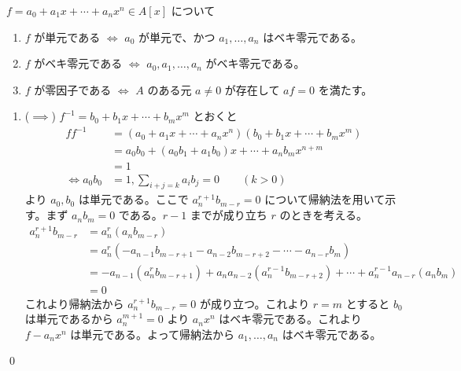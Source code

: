 \documentclass[uplatex,dvipdfmx,a4paper,11pt]{jlreq}
\makeatletter
\theoremstyle{definition}
\renewenvironment{proof}[1][\proofname]{\par
  \normalfont
  \topsep6\p@\@plus6\p@ \trivlist
  \item[\hskip\labelsep{\bfseries #1}\@addpunct{\bfseries}]\ignorespaces\quad\par
}{%
  \qed\endtrivlist\@endpefalse
}
\renewcommand\proofname{証明}
\makeatother
\begin{document}
\begin{proposition}
  $f = a_0 + a_1x + \cdots + a_nx^n\in A[x]$ について
  \begin{enumerate}
    \item $f$ が単元である $\iff$ $a_0$ が単元で、かつ $a_1,\ldots,a_n$ はベキ零元である。
    \item $f$ がベキ零元である $\iff$ $a_0,a_1,\ldots,a_n$ がベキ零元である。
    \item $f$ が零因子である $\iff$ $A$ のある元 $a \neq 0$ が存在して $af = 0$ を満たす。
  \end{enumerate}
\end{proposition}
\begin{proof}
  \begin{enumerate}
    \item ($\implies$) $f^{-1} = b_0 + b_1x + \cdots + b_mx^m$ とおくと
          \begin{align}
            ff^{-1}     & = (a_0 + a_1x + \cdots + a_nx^n)(b_0 + b_1x + \cdots + b_mx^m) \\
                        & = a_0b_0 + (a_0b_1 + a_1b_0)x + \cdots + a_nb_mx^{n+m}         \\
                        & = 1                                                            \\
            \iff a_0b_0 & = 1, \sum_{i + j = k}a_ib_j = 0 \qquad (k > 0)
          \end{align}
          より $a_0, b_0$ は単元である。ここで $a_n^{r + 1}b_{m - r} = 0$ について帰納法を用いて示す。まず $a_nb_m = 0$ である。$r - 1$ までが成り立ち $r$ のときを考える。
          \begin{align}
            a_n^{r+1}b_{m-r} & = a_n^r(a_nb_{m-r})                                                                              \\
                             & = a_n^r(- a_{n-1}b_{m-r+1} - a_{n-2}b_{m-r+2} - \cdots - a_{n-r}b_m)                             \\
                             & = - a_{n-1}(a_n^rb_{m-r+1}) + a_na_{n-2}(a_n^{r-1}b_{m-r+2}) + \cdots + a_n^{r-1}a_{n-r}(a_nb_m) \\
                             & = 0
          \end{align}
          これより帰納法から $a_n^{r + 1}b_{m - r} = 0$ が成り立つ。これより $r = m$ とすると $b_0$ は単元であるから $a_n^{m+1} = 0$ より $a_nx^n$ はベキ零元である。これより $f - a_nx^n$ は単元である。よって帰納法から $a_1,\ldots,a_n$ はベキ零元である。


\end{enumerate}
\end{proof}
\end{document}

